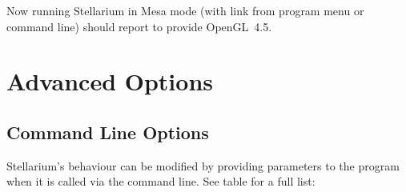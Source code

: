 \noindent Now running Stellarium in Mesa mode (with link from program menu or command line) should report to provide OpenGL~4.5.



\chapter{Advanced Options}

\section{Command Line Options} 
\label{sec:CommandLineOptions}

Stellarium's behaviour can be modified by providing parameters to the
program when it is called via the command line. See table for a full list:

